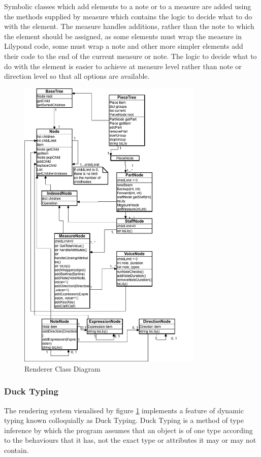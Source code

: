 Symbolic classes which add elements to a note or to a measure are added using the methods supplied by measure which contains the logic to decide what to do with the element. The measure handles additions, rather than the note to which the element should be assigned, as some elements must wrap the measure in Lilypond code, some must wrap a note and other more simpler elements add their code to the end of the current measure or note. The logic to decide what to do with the element is easier to achieve at measure level rather than note or direction level so that all options are available.
\begin{figure}[H]
    \centering
    \includegraphics[width=250pt]{diagrams/render-tree.png}
    \caption{Renderer Class Diagram}
    \label{fig:classdiagram}
\end{figure}




\subsubsection{Duck Typing}
The rendering system visualised by figure \ref{fig:classdiagram} implements a feature of dynamic typing known colloquially as Duck Typing. Duck Typing is a method of type inference by which the program assumes that an object is of one type according to the behaviours that it has, not the exact type or attributes it may or may not contain. %

